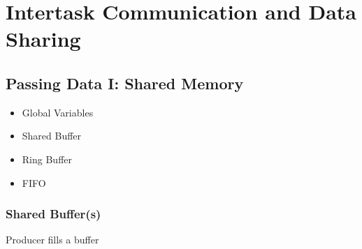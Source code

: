 %
%



\section{Intertask Communication and Data Sharing}

\subsection{Passing Data I: Shared Memory}

\begin{itemize}
        \item Global Variables
        \item Shared Buffer
        \item Ring Buffer
        \item FIFO
\end{itemize}


\subsubsection{Shared Buffer(s)}
Producer fills a buffer

